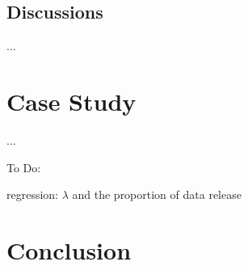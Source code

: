 \documentclass[mnsc]{informs3}
\begin{document}
\subsection{Discussions}

...

\section{Case Study}\label{sec-kaggle-application}

...

To Do:

regression: $\lambda$ and the proportion of data release


\newpage
\section{Conclusion}


%
%
%
\end{document}
